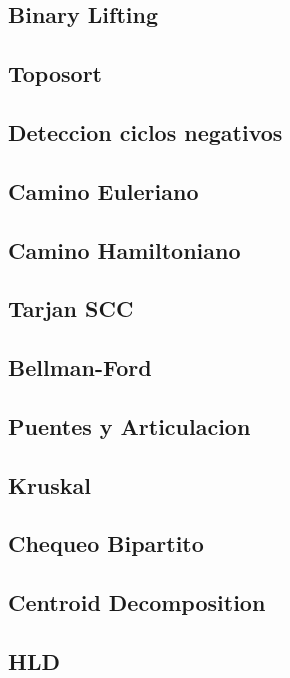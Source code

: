 \documentclass[a4paper,11pt,landscape,twocolumn]{article}
\begin{document}
\subsection{Binary Lifting}

\subsection{Toposort}

\subsection{Deteccion ciclos negativos}

\subsection{Camino Euleriano}

\subsection{Camino Hamiltoniano}

\subsection{Tarjan SCC}

\subsection{Bellman-Ford}

\subsection{Puentes y Articulacion}

\subsection{Kruskal}

\subsection{Chequeo Bipartito}

\subsection{Centroid Decomposition}

\subsection{HLD}

\end{document}
